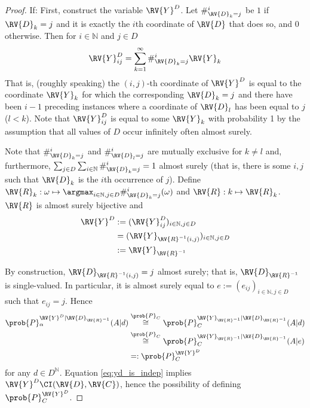 \begin{proof}
If:
First, construct the variable $\RV{Y}^D$. Let $\#_{\RV{D}_k=j}^i$ be $1$ if $\RV{D}_k=j$ and it is exactly the $i$th coordinate of $\RV{D}$ that does so, and $0$ otherwise. Then for $i\in \mathbb{N}$ and $j\in D$
\begin{align}
    \RV{Y}^D_{ij} = \sum_{k=1}^{\infty} \#_{\RV{D}_k=j}^i \RV{Y}_k
\end{align}
That is, (roughly speaking) the $(i,j)$-th coordinate of $\RV{Y}^D$ is equal to the coordinate $\RV{Y}_k$ for which the corresponding $\RV{D}_k= j$ and there have been $i-1$ preceding instances where a coordinate of $\RV{D}_l$ has been equal to $j$ ($l<k$). Note that $\RV{Y}^D_{ij}$ is equal to some $\RV{Y}_k$ with probability 1 by the assumption that all values of $D$ occur infinitely often almost surely.

Note that $\#_{\RV{D}_k=j}^i$ and $\#_{\RV{D}_l=j}^i$ are mutually exclusive for $k\neq l$ and, furthermore, $\sum_{j\in D}\sum_{i\in \mathbb{N}} \#_{\RV{D}_k=j}^i=1$ almost surely (that is, there is some $i,j$ such that $\RV{D}_k$ is the $i$th occurrence of $j$). Define $\RV{R}_k:\omega \mapsto \argmax_{i\in\mathbb{N},j\in D} \#_{\RV{D}_k=j}^i(\omega)$ and $\RV{R}:k\mapsto \RV{R}_k$. $\RV{R}$ is almost surely bijective and 
\begin{align}
    \RV{Y}^D&:= (\RV{Y}^D_{ij})_{i\in \mathbb{N},j\in D}\\
    &= (\RV{Y}_{\RV{R}^{-1}(i,j)})_{i\in \mathbb{N},j\in D}\\
    &:= \RV{Y}_{\RV{R}^{-1}}
\end{align}

By construction, $\RV{D}_{\RV{R}^{-1}(i,j)}=j$ almost surely; that is, $\RV{D}_{\RV{R}^{-1}}$ is single-valued. In particular, it is almost surely equal to $e:=(e_{ij})_{i\in\mathbb{N},j\in D}$ such that $e_{ij}=j$. Hence
\begin{align}
    \prob{P}_\alpha^{\RV{Y}^D|\RV{D}_{\RV{R}^{-1}}}(A|d)&\overset{\prob{P}_C}{\cong} \prob{P}_C^{\RV{Y}_{\RV{R}^{-1}}|\RV{D}_{\RV{R}^{-1}}}(A|d)\\
    &\overset{\prob{P}_C}{\cong} \prob{P}_C^{\RV{Y}_{\RV{R}^{-1}}|\RV{D}_{\RV{R}^{-1}}}(A|e)\label{eq:yd_is_indep}\\
    &=: \prob{P}_C^{\RV{Y}^D}\label{eq:yd_dist}
\end{align}
for any $d\in D^{\mathbb{N}}$. Equation \ref{eq:yd_is_indep} implies $\RV{Y}^D\CI (\RV{D},\RV{C})$, hence the possibility of defining $\prob{P}_C^{\RV{Y}^D}$.


\end{proof}
